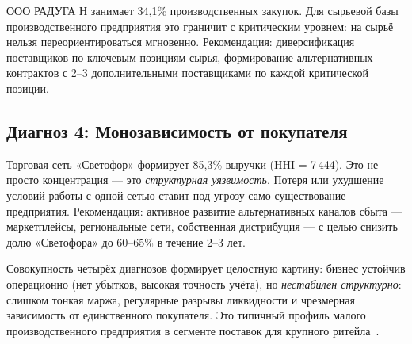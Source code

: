 ООО РАДУГА Н занимает 34,1\% производственных закупок. Для сырьевой базы производственного предприятия это граничит с критическим уровнем: на сырьё нельзя переориентироваться мгновенно. Рекомендация: диверсификация поставщиков по ключевым позициям сырья, формирование альтернативных контрактов с 2--3 дополнительными поставщиками по каждой критической позиции.

\subsection{Диагноз 4: Монозависимость от покупателя}

Торговая сеть «Светофор» формирует 85,3\% выручки (HHI = 7\,444). Это не просто концентрация --- это \textit{структурная уязвимость}. Потеря или ухудшение условий работы с одной сетью ставит под угрозу само существование предприятия. Рекомендация: активное развитие альтернативных каналов сбыта --- маркетплейсы, региональные сети, собственная дистрибуция --- с целью снизить долю «Светофора» до 60--65\% в течение 2--3 лет.

Совокупность четырёх диагнозов формирует целостную картину: бизнес устойчив операционно (нет убытков, высокая точность учёта), но \textit{нестабилен структурно}: слишком тонкая маржа, регулярные разрывы ликвидности и чрезмерная зависимость от единственного покупателя. Это типичный профиль малого производственного предприятия в сегменте поставок для крупного ритейла~\cite{sme_profitability_ru}.
